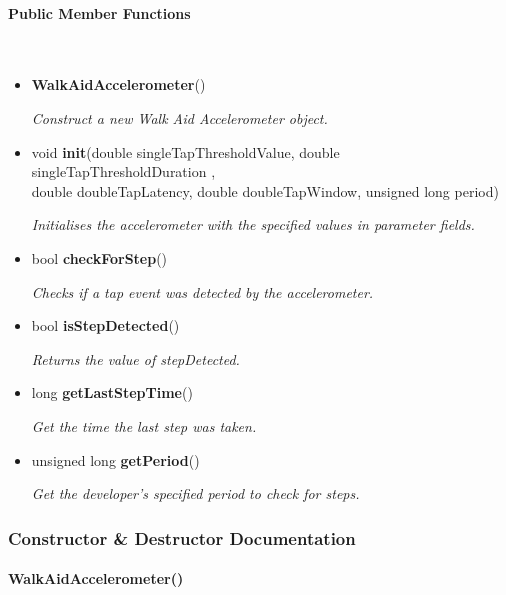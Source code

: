     \paragraph{Public Member Functions}\mbox{}\\

        \begin{itemize}
            \item \textbf{WalkAidAccelerometer}() 
            
                \quad \quad \textit{Construct a new Walk Aid Accelerometer object.}

            \item void \textbf{init}(double singleTapThresholdValue, double singleTapThresholdDuration
            , \\double doubleTapLatency, double doubleTapWindow, unsigned long period) 
            
                \quad \quad \textit{Initialises the accelerometer with the specified values in parameter fields.}

            \item bool \textbf{checkForStep}() 
            
                \quad \quad \textit{Checks if a tap event was detected by the accelerometer.}

            \item bool \textbf{isStepDetected}() 
            
                \quad \quad \textit{Returns the value of stepDetected.}

            \item long \textbf{getLastStepTime}() 
            
                \quad \quad \textit{Get the time the last step was taken.}

            \item unsigned long \textbf{getPeriod}() 
            
                \quad \quad \textit{Get the developer's specified period to check for steps.}\\

        \end{itemize}

    \subsubsection{Constructor \& Destructor Documentation}\mbox{}


        \paragraph{WalkAidAccelerometer()}\mbox{}\\

